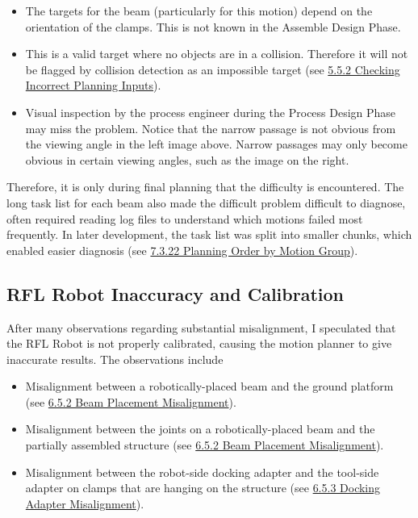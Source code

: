 {\begin{itemize}
	\item The targets for the beam (particularly for this motion) depend on the orientation of the clamps. This is not known in the Assemble Design Phase.

	\item This is a valid target where no objects are in a collision. Therefore it will not be flagged by collision detection as an impossible target (see \ul{5.5.2 Checking Incorrect Planning Inputs}).

	\item Visual inspection by the process engineer during the Process Design Phase may miss the problem. Notice that the narrow passage is not obvious from the viewing angle in the left image above. Narrow passages may only become obvious in certain viewing angles, such as the image on the right.

\end{itemize}
Therefore, it is only during final planning that the difficulty is encountered. The long task list for each beam also made the difficult problem difficult to diagnose, often required reading log files to understand which motions failed most frequently. In later development, the task list was split into smaller chunks, which enabled easier diagnosis (see \ul{7.3.22 Planning Order by Motion Group}). 

\subsection{RFL Robot Inaccuracy and Calibration}

After many observations regarding substantial misalignment, I speculated that the RFL Robot is not properly calibrated, causing the motion planner to give inaccurate results. The observations include

\begin{itemize}
	\item Misalignment between a robotically-placed beam and the ground platform (see \ul{6.5.2 Beam Placement Misalignment}).

	\item Misalignment between the joints on a robotically-placed beam and the partially assembled structure (see \ul{6.5.2 Beam Placement Misalignment}).

	\item Misalignment between the robot-side docking adapter and the tool-side adapter on clamps that are hanging on the structure (see \ul{6.5.3 Docking Adapter Misalignment}).


\end{itemize}}
